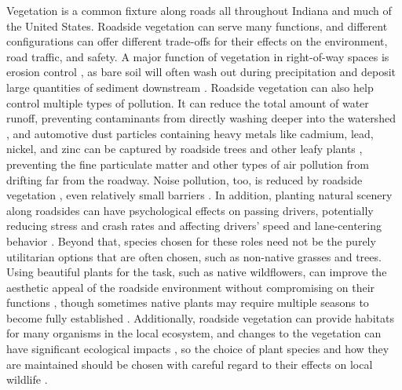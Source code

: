 \documentclass[
]{article}
\begin{document}
Vegetation is a common fixture along roads all throughout Indiana and
much of the United States. Roadside vegetation can serve many functions,
and different configurations can offer different trade-offs for their
effects on the environment, road traffic, and safety. A major function
of vegetation in right-of-way spaces is erosion control
\parencite{Milton_HandbookRoadEcology_2015}, as bare soil will often wash
out during precipitation and deposit large quantities of sediment
downstream
\parencite{Richardson_PracticesErosionControl_1970,Bochet_FactorsControllingVegetation_2004,Baets_ImpactRootArchitecture_2007,Wang_OptimizingRoadsideSlope_2024}.
Roadside vegetation can also help control multiple types of pollution.
It can reduce the total amount of water runoff, preventing contaminants
from directly washing deeper into the watershed
\parencite{Wang_OptimizingRoadsideSlope_2024}, and automotive dust
particles containing heavy metals like cadmium, lead, nickel, and zinc
can be captured by roadside trees and other leafy plants
\parencite{SzyszlakBarglowicz_FunctionRoadsideVegetation_2013},
preventing the fine particulate matter
\parencite{Ozdemir_MitigationImpactRoadside_2019} and other types of air
pollution \parencite{Tong_RoadsideVegetationBarrier_2016} from drifting
far from the roadway. Noise pollution, too, is reduced by roadside
vegetation \parencite{Reethof_EffectPlantingsRadiation_1973}, even
relatively small barriers
\parencite{Kalansuriya_EffectRoadsideVegetation_2009}. In addition,
planting natural scenery along roadsides can have psychological effects
on passing drivers, potentially reducing stress and crash rates
\parencite{Fitzpatrick_InfluenceClearZone_2014} and affecting drivers'
speed and lane-centering behavior
\parencite{Calvi_DoesRoadsideVegetation_2015}. Beyond that, species
chosen for these roles need not be the purely utilitarian options that
are often chosen, such as non-native grasses and trees. Using beautiful
plants for the task, such as native wildflowers, can improve the
aesthetic appeal of the roadside environment without compromising on
their functions
\parencite{Dana_WildflowersIndianaHighways_1996,Isaacs_MaximizingArthropodMediated_2009,Ebbers_EstablishmentWildflowerIslands_2024},
though sometimes native plants may require multiple seasons to become
fully established
\parencite{Herold_IntegratedVegetationManagement_2014,Barnes_NativeWarmSeason_2000}.
Additionally, roadside vegetation can provide habitats for many
organisms in the local ecosystem, and changes to the vegetation can have
significant ecological impacts
\parencite{Forman_RoadEcology_2002,Valko_RoadsideGrasslandRestoration_2023},
so the choice of plant species and how they are maintained should be
chosen with careful regard to their effects on local wildlife
\parencite{Ryu_QuantifyingBenefitsRoadside_2025}.
\end{document}
